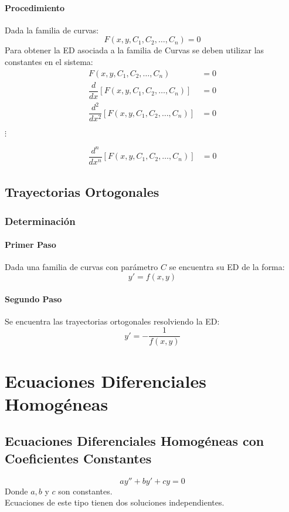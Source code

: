 \subsubsection{Procedimiento}
Dada la familia de curvas:
$$F(x,y,C_1,C_2,\ldots,C_n)=0$$
Para obtener la ED asociada a la familia de Curvas se deben utilizar las constantes en el sistema:
\begin{align*}
F(x,y,C_1,C_2,\ldots,C_n) & = 0 \\
\dfrac{d}{dx}\left[ F(x,y,C_1,C_2,\ldots,C_n)\right]  & = 0 \\
\dfrac{d^2}{dx^2}\left[ F(x,y,C_1,C_2,\ldots,C_n)\right]  & = 0 
\end{align*}
\begin{center}
$\vdots $
\end{center}
\begin{align*}
\dfrac{d^n}{dx^n}\left[ F(x,y,C_1,C_2,\ldots,C_n)\right]  & = 0 
\end{align*}
\section{Trayectorias Ortogonales}
\subsection{Determinación}
\subsubsection{Primer Paso}
Dada una familia de curvas con parámetro $C$ se encuentra su ED de la forma:
$$y'=f(x,y)$$
\subsubsection{Segundo Paso}
Se encuentra las trayectorias ortogonales resolviendo la ED:
$$y' = -\dfrac{1}{f(x,y)}$$
\chapter{Ecuaciones Diferenciales Homogéneas}
\section{Ecuaciones Diferenciales Homogéneas con Coeficientes Constantes}
\begin{equation}
ay'' + by' +cy = 0
\end{equation}
Donde $a,b$ y $c$ son constantes. \\${ }$\\
Ecuaciones de este tipo tienen dos soluciones independientes.
